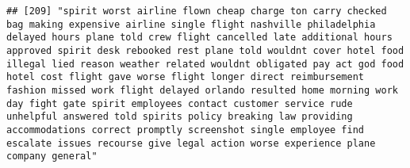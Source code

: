 \documentclass[
]{article}
\begin{document}
\begin{verbatim}
## [209] "spirit worst airline flown cheap charge ton carry checked bag making expensive airline single flight nashville philadelphia delayed hours plane told crew flight cancelled late additional hours approved spirit desk rebooked rest plane told wouldnt cover hotel food illegal lied reason weather related wouldnt obligated pay act god food hotel cost flight gave worse flight longer direct reimbursement fashion missed work flight delayed orlando resulted home morning work day fight gate spirit employees contact customer service rude unhelpful answered told spirits policy breaking law providing accommodations correct promptly screenshot single employee find escalate issues recourse give legal action worse experience plane company general"                                                                                                                                                                                                                                                                                                                                                                                                                                                                                                                                                                                                                                                                                                                                                                                                                                                                                                                                                                                                                            

\end{verbatim}
\end{document}
